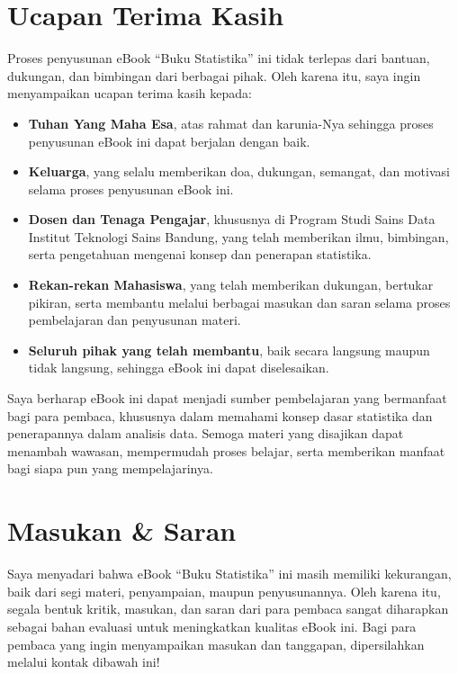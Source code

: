 \documentclass[
  indonesian,
  letterpaper,
]{book}
\begin{document}
\section*{Ucapan Terima Kasih}\label{ucapan-terima-kasih}


Proses penyusunan eBook ``Buku Statistika'' ini tidak terlepas dari
bantuan, dukungan, dan bimbingan dari berbagai pihak. Oleh karena itu,
saya ingin menyampaikan ucapan terima kasih kepada:

\begin{itemize}
\item
  \textbf{Tuhan Yang Maha Esa}, atas rahmat dan karunia-Nya sehingga
  proses penyusunan eBook ini dapat berjalan dengan baik.
\item
  \textbf{Keluarga}, yang selalu memberikan doa, dukungan, semangat, dan
  motivasi selama proses penyusunan eBook ini.
\item
  \textbf{Dosen dan Tenaga Pengajar}, khususnya di Program Studi Sains
  Data Institut Teknologi Sains Bandung, yang telah memberikan ilmu,
  bimbingan, serta pengetahuan mengenai konsep dan penerapan statistika.
\item
  \textbf{Rekan-rekan Mahasiswa}, yang telah memberikan dukungan,
  bertukar pikiran, serta membantu melalui berbagai masukan dan saran
  selama proses pembelajaran dan penyusunan materi.
\item
  \textbf{Seluruh pihak yang telah membantu}, baik secara langsung
  maupun tidak langsung, sehingga eBook ini dapat diselesaikan.
\end{itemize}

Saya berharap eBook ini dapat menjadi sumber pembelajaran yang
bermanfaat bagi para pembaca, khususnya dalam memahami konsep dasar
statistika dan penerapannya dalam analisis data. Semoga materi yang
disajikan dapat menambah wawasan, mempermudah proses belajar, serta
memberikan manfaat bagi siapa pun yang mempelajarinya.

\section*{Masukan \& Saran}\label{masukan-saran}


Saya menyadari bahwa eBook ``Buku Statistika'' ini masih memiliki
kekurangan, baik dari segi materi, penyampaian, maupun penyusunannya.
Oleh karena itu, segala bentuk kritik, masukan, dan saran dari para
pembaca sangat diharapkan sebagai bahan evaluasi untuk meningkatkan
kualitas eBook ini. Bagi para pembaca yang ingin menyampaikan masukan
dan tanggapan, dipersilahkan melalui kontak dibawah ini!
\end{document}
